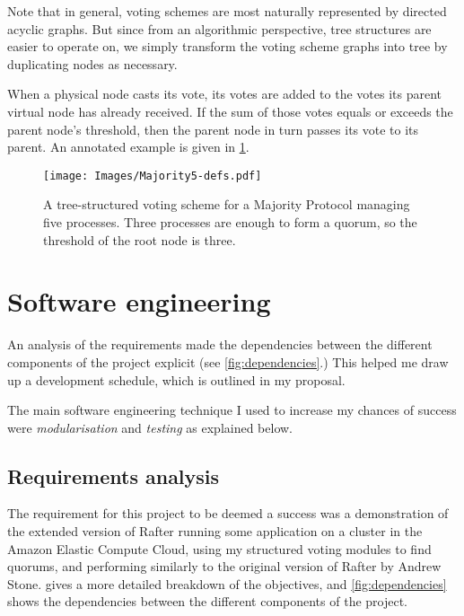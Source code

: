 \documentclass[11pt,chapterprefix=true,toc=bibliography,numbers=noendperiod,
               footnotes=multiple,twoside]{scrreprt}
\begin{document}
Note that in general, voting schemes are most naturally represented by directed acyclic graphs. But since from an algorithmic perspective, tree structures are easier to operate on, we simply transform the voting scheme graphs into tree by duplicating nodes as necessary.

When a physical node casts its vote, its votes are added to the votes its parent virtual node has already received. If the sum of those votes equals or exceeds the parent node's threshold, then the parent node in turn passes its vote to its parent. An annotated example is given in \cref{fig:majority5-defs}.

\begin{figure}[h]
    \centering
    \texttt{[image: Images/Majority5-defs.pdf]}
    \caption[Tree-structured voting scheme for a Majority Protocol]{A tree-structured voting scheme for a Majority Protocol managing five processes. Three processes are enough to form a quorum, so the threshold of the root node is three.}
    \label{fig:majority5-defs}
\end{figure}

\section{Software engineering\label{sc:software-engineering}}

An analysis of the requirements made the dependencies between the different components of the project explicit (see \cref{fig:dependencies}.) This helped me draw up a development schedule, which is outlined in my proposal.

The main software engineering technique I used to increase my chances of success were \emph{modularisation} and \emph{testing} as explained below.

\subsection{Requirements analysis\label{sc:requirements-analysis}}

The requirement for this project to be deemed a success was a demonstration of the extended version of Rafter running some application on a cluster in the Amazon Elastic Compute Cloud, using my structured voting modules to find quorums, and performing similarly to the original version of Rafter by Andrew Stone.  gives a more detailed breakdown of the objectives, and \cref{fig:dependencies} shows the dependencies between the different components of the project.
\end{document}
